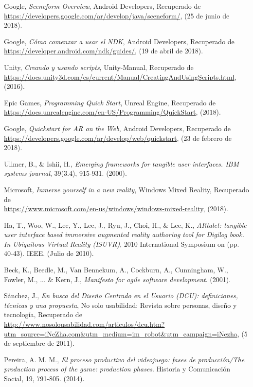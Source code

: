 Google, {\em Sceneform Overview}, Android Developers, Recuperado de \\
\url{https://developers.google.com/ar/develop/java/sceneform/}, (25 de junio de 2018).

Google, {\em Cómo comenzar a usar el NDK}, Android Developers, Recuperado de \\
\url{https://developer.android.com/ndk/guides/}, (19 de abril de 2018).

Unity, {\em Creando y usando scripts}, Unity-Manual, Recuperado de \\
\url{https://docs.unity3d.com/es/current/Manual/CreatingAndUsingScripts.html}, (2016).

Epic Games, {\em Programming Quick Start}, Unreal Engine, Recuperado de \\
\url{https://docs.unrealengine.com/en-US/Programming/QuickStart}, (2018).

Google, {\em Quickstart for AR on the Web}, Android Developers, Recuperado de \\
\url{https://developers.google.com/ar/develop/web/quickstart}, (23 de febrero de 2018).

Ullmer, B., & Ishii, H., {\em Emerging frameworks for tangible user interfaces. IBM systems journal}, 39(3.4), 915-931. (2000).

Microsoft, {\em Inmerse yourself in a new reality}, Windows Mixed Reality, Recuperado de \\
\url{https://www.microsoft.com/en-us/windows/windows-mixed-reality}, (2018).

Ha, T., Woo, W., Lee, Y., Lee, J., Ryu, J., Choi, H., & Lee, K., {\em ARtalet: tangible user interface based immersive augmented reality authoring tool for Digilog book. In Ubiquitous Virtual Reality (ISUVR)}, 2010 International Symposium on (pp. 40-43). IEEE. (Julio de 2010).

Beck, K., Beedle, M., Van Bennekum, A., Cockburn, A., Cunningham, W., Fowler, M., ... & Kern, J., {\em Manifesto for agile software development}. (2001).

Sánchez, J., {\em En busca del Diseño Centrado en el Usuario (DCU): definiciones, técnicas y una propuesta}, No solo usabilidad: Revista sobre personas, diseño y tecnología, Recuperado de \\
\url{http://www.nosolousabilidad.com/articulos/dcu.htm?utm_source=iNeZha.com&utm_medium=im_robot&utm_campaign=iNezha}, (5 de septiembre de 2011).

Pereira, A. M. M., {\em El proceso productivo del videojuego: fases de producción/The production process of the game: production phases}. Historia y Comunicación Social, 19, 791-805. (2014).

